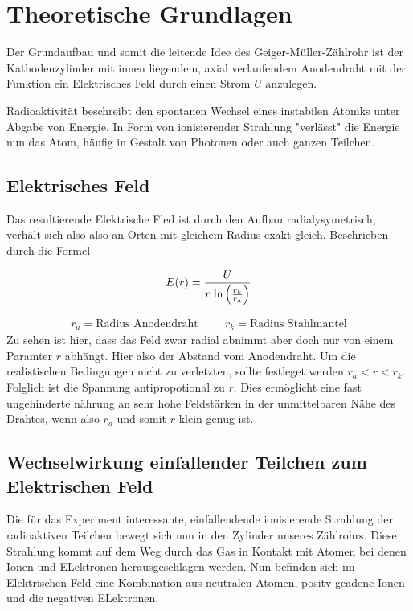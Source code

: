 \newpage
\section{Theoretische Grundlagen}

Der Grundaufbau und somit die leitende Idee des Geiger-Müller-Zählrohr ist der Kathodenzylinder %
mit innen liegendem, axial verlaufendem Anodendraht mit der Funktion ein Elektrisches Feld durch einen Strom $U$ anzulegen.

Radioaktivität beschreibt den spontanen Wechsel eines instabilen Atomks unter Abgabe von Energie. In Form von ionisierender Strahlung "verlässt" die Energie nun das Atom, häufig in Gestalt von Photonen oder auch ganzen Teilchen.



\subsection{Elektrisches Feld}

Das resultierende Elektrische Fled ist durch den Aufbau radialysymetrisch, verhält sich also also an Orten mit gleichem Radius exakt gleich.
Beschrieben durch die Formel 

\begin{equation}  %
\label{eqn:efeld}
E(r) = \frac{U}{r \hspace{0.1cm} \text{ln} \left( \frac{r_k}{r_a} \right) }
\end{equation}

\begin{align*}
r_a = \text{Radius Anodendraht}     \hspace{1cm} r_k = \text{Radius Stahlmantel}
\end{align*}
Zu sehen ist hier, dass das Feld zwar radial abnimmt aber doch nur von einem Paramter $r$ abhängt. Hier also der Abstand vom Anodendraht.
Um die realistischen Bedingungen nicht zu verletzten, sollte festleget werden $r_a<r<r_k$.
Folglich ist die Spannung antipropotional zu $r$. Dies ermöglicht eine fast ungehinderte nährung an sehr hohe Feldstärken in der unmittelbaren Nähe des Drahtes, wenn also $r_a$ und somit $r$ klein genug ist. 

\subsection{Wechselwirkung einfallender Teilchen zum Elektrischen Feld} %
Die für das Experiment interessante, einfallendende ionisierende Strahlung der radioaktiven Teilchen bewegt sich nun in den Zylinder unseres Zählrohrs.
Diese Strahlung kommt auf dem Weg durch das Gas in Kontakt mit Atomen bei denen Ionen und ELektronen herausgeschlagen werden. 
Nun befinden sich im Elektrischen Feld eine Kombination aus neutralen Atomen, positv geadene Ionen und die negativen ELektronen. 

